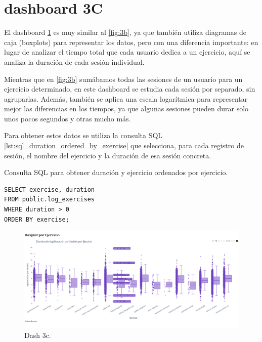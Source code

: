 \documentclass[a4paper, 12pt]{book}
\begin{document}
\section{dashboard 3C}

El dashboard \ref{fig:3c} es muy similar al \ref{fig:3b}, ya que también utiliza diagramas de caja (boxplots) para representar los datos, pero con una diferencia importante: en lugar de analizar el tiempo total que cada usuario dedica a un ejercicio, aquí se analiza la duración de cada sesión individual.

Mientras que en \ref{fig:3b} sumábamos todas las sesiones de un usuario para un ejercicio determinado, en este dashboard se estudia cada sesión por separado, sin agruparlas. Además, también se aplica una escala logarítmica para representar mejor las diferencias en los tiempos, ya que algunas sesiones pueden durar solo unos pocos segundos y otras mucho más.

Para obtener estos datos se utiliza la consulta SQL \ref{lst:sql_duration_ordered_by_exercise} que selecciona, para cada registro de sesión, el nombre del ejercicio y la duración de esa sesión concreta.

\begin{listing}[h!]
    \caption{Consulta SQL para obtener duración y ejercicio ordenados por ejercicio.}{}
    \label{lst:sql_duration_ordered_by_exercise}
    \begin{verbatim}
SELECT exercise, duration
FROM public.log_exercises
WHERE duration > 0
ORDER BY exercise;
    \end{verbatim}
\end{listing}

\begin{figure}
  \centering
  \includegraphics[width=1.1\textwidth]{img/3c.png}
  \caption{Dash 3c.}\label{fig:3c}
\end{figure}
\end{document}
